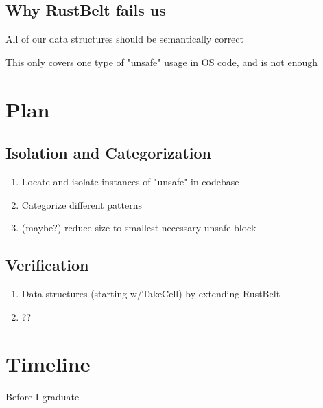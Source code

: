 \documentclass[12pt]{article}
\begin{document}
\subsection{Why RustBelt fails us}
All of our data structures should be semantically correct

This only covers one type of "unsafe" usage in OS code, and is not enough

\section{Plan}

\subsection{Isolation and Categorization}
\begin{enumerate}
    \item Locate and isolate instances of "unsafe" in codebase
    \item Categorize different patterns
    \item (maybe?) reduce size to smallest necessary unsafe block
\end{enumerate}

\subsection{Verification}
\begin{enumerate}
    \item Data structures (starting w/TakeCell) by extending RustBelt
    \item ??
\end{enumerate}

\section{Timeline}
Before I graduate
\end{document}
